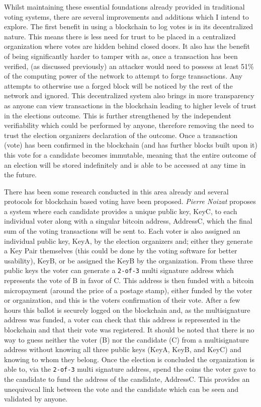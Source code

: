 \documentclass{article}
\begin{document}
Whilst maintaining these essential foundations already provided in traditional voting systems, there are several improvements and additions which I intend to explore. The first benefit in using a blockchain to log votes is in its decentralized nature. This means there is less need for trust to be placed in a centralized organization where votes are hidden behind closed doors. It also has the benefit of being significantly harder to tamper with as, once a transaction has been verified, (as discussed previously) an attacker would need to possess at least 51\% of the computing power of the network to attempt to forge transactions. Any attempts to otherwise use a forged block will be noticed by the rest of the network and ignored. This decentralized system also brings in more transparency as anyone can view transactions in the blockchain leading to higher levels of trust in the elections outcome. This is further strengthened by the independent verifiability which could be performed by anyone, therefore removing the need to trust the election organizers declaration of the outcome. Once a transaction (vote) has been confirmed in the blockchain (and has further blocks built upon it) this vote for a candidate becomes immutable, meaning that the entire outcome of an election will be stored indefinitely and is able to be accessed at any time in the future.

There has been some research conducted in this area already and several protocols for blockchain based voting have been proposed. \textit{Pierre Noizat} proposes a system \citep{3_noizat_2016} where each candidate provides a unique public key, KeyC, to each individual voter along with a singular bitcoin address, AddressC, which the final sum of the voting transactions will be sent to. Each voter is also assigned an individual public key, KeyA, by the election organizers and; either they generate a Key Pair themselves (this could be done by the voting software for better usability), KeyB, or be assigned the KeyB by the organization. From these three public keys the voter can generate a \verb|2-of-3| multi signature address which represents the vote of B in favor of C. This address is then funded with a bitcoin micropayment (around the price of a postage stamp), either funded by the voter or organization, and this is the voters confirmation of their vote. After a few hours this ballot is securely logged on the blockchain and, as the multisignature address was funded, a voter can check that this address is represented in the blockchain and that their vote was registered. It should be noted that there is no way to guess neither the voter (B) nor the candidate (C) from a multisignature address without knowing all three public keys (KeyA, KeyB, and KeyC) and knowing to whom they belong. Once the election is concluded the organization is able to, via the \verb|2-of-3| multi signature address, spend the coins the voter gave to the candidate to fund the address of the candidate, AddressC. This provides an unequivocal link between the vote and the candidate which can be seen and validated by anyone.
\end{document}
